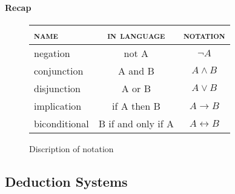 \paragraph{Recap}

\begin{figure}[H]
  \centering
  \begin{tabular}{lcc}
    \textsc{name} & \textsc{in language} & \textsc{notation} \\\hline
    negation & not A & $\lnot A$ \\ \hline
    conjunction & A and B & $A \land B$ \\ \hline
    disjunction & A or B & $A \lor B$ \\ \hline
    implication & if A then B & $A \to B$ \\ \hline
    biconditional & B if and only if A & $A \leftrightarrow B$ \\ \hline

  \end{tabular}
  \caption{Discription of notation}
  \label{fig:propositional}
\end{figure}





\subsection{Deduction Systems}

%



